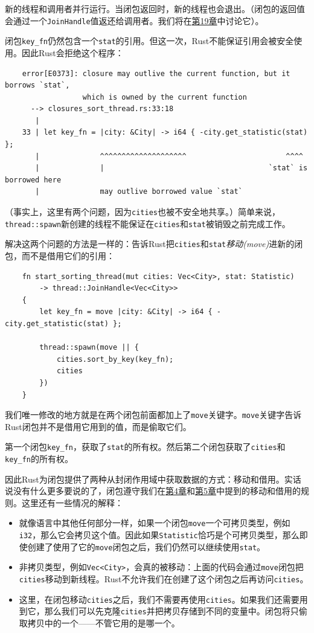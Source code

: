 新的线程和调用者并行运行。当闭包返回时，新的线程也会退出。（闭包的返回值会通过一个\texttt{JoinHandle}值返还给调用者。我们将在\hyperref[ch19]{第19章}中讨论它）。

闭包\texttt{key\_fn}仍然包含一个\texttt{stat}的引用。但这一次，Rust不能保证引用会被安全使用。因此Rust会拒绝这个程序：
\begin{verbatim}
    error[E0373]: closure may outlive the current function, but it borrows `stat`,
                  which is owned by the current function
      --> closures_sort_thread.rs:33:18
       |
    33 | let key_fn = |city: &City| -> i64 { -city.get_statistic(stat) };
       |              ^^^^^^^^^^^^^^^^^^^^                       ^^^^
       |              |                                      `stat` is borrowed here
       |              may outlive borrowed value `stat`
\end{verbatim}

（事实上，这里有两个问题，因为\texttt{cities}也被不安全地共享。）简单来说，\texttt{thread::spawn}新创建的线程不能保证在\texttt{cities}和\texttt{stat}被销毁之前完成工作。

解决这两个问题的方法是一样的：告诉Rust把\texttt{cities}和\texttt{stat}\emph{移动(move)}进新的闭包，而不是借用它们的引用：
\begin{verbatim}
    fn start_sorting_thread(mut cities: Vec<City>, stat: Statistic)
        -> thread::JoinHandle<Vec<City>>
    {
        let key_fn = move |city: &City| -> i64 { -city.get_statistic(stat) };

        thread::spawn(move || {
            cities.sort_by_key(key_fn);
            cities
        })
    }
\end{verbatim}

我们唯一修改的地方就是在两个闭包前面都加上了\texttt{move}关键字。\texttt{move}关键字告诉Rust闭包并不是借用它用到的值，而是偷取它们。

第一个闭包\texttt{key\_fn}，获取了\texttt{stat}的所有权。然后第二个闭包获取了\texttt{cities}和\texttt{key\_fn}的所有权。

因此Rust为闭包提供了两种从封闭作用域中获取数据的方式：移动和借用。实话说没有什么更多要说的了，闭包遵守我们在\hyperref[ch04]{第4章}和\hyperref[ch05]{第5章}中提到的移动和借用的规则。这里还有一些情况的解释：
\begin{itemize}
    \item 就像语言中其他任何部分一样，如果一个闭包\texttt{move}一个可拷贝类型，例如\texttt{i32}，那么它会拷贝这个值。因此如果\texttt{Statistic}恰巧是个可拷贝类型，那么即使创建了使用了它的\texttt{move}闭包之后，我们仍然可以继续使用\texttt{stat}。
    \item 非拷贝类型，例如\texttt{Vec<City>}，会真的被移动：上面的代码会通过\texttt{move}闭包把\texttt{cities}移动到新线程。Rust不允许我们在创建了这个闭包之后再访问\texttt{cities}。
    \item 这里，在闭包移动\texttt{cities}之后，我们不需要再使用\texttt{cities}。如果我们还需要用到它，那么我们可以先克隆\texttt{cities}并把拷贝存储到不同的变量中。闭包将只偷取拷贝中的一个——不管它用的是哪一个。
\end{itemize}

